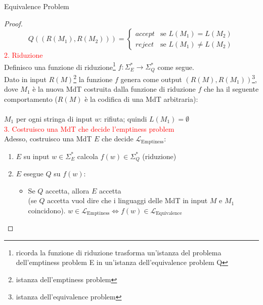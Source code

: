 \documentclass{article}  %
\theoremstyle{definition}
\begin{document}
\begin{theorem}{Equivalence Problem}
\begin{proof}
		\[
			Q((R(M_1),R(M_2))) =
			\begin{cases}
				accept & \text{se } L(M_1)=L(M_2)      \\
				reject & \text{se } L(M_1) \neq L(M_2)
			\end{cases}
		\]
		\textcolor{red}{2. Riduzione} \\
		Definisco una funzione di riduzione\footnote{ricorda la funzione di riduzione trasforma un'istanza del problema dell'emptiness problem
			E in un'istanza dell'equivalence problem Q}
		$f: \Sigma_E^* \rightarrow \Sigma_Q^*$ come segue. \\
		Dato in input $R(M)$\footnote{istanza dell'emptiness problem}  la funzione $f$ genera come output $(R(M),R(M_1))$\footnote
		{istanza dell'equivalence problem}, dove $M_1$ è la nuova MdT costruita dalla funzione di riduzione $f$ che ha il seguente
		comportamento ($R(M)$ è la codifica di una MdT arbitraria):\\ \\ $M_1$ per ogni stringa di input $w$: rifiuta; quindi $L(M_1)=\emptyset$ \\
		\textcolor{red}{3. Costruisco una MdT che decide l'emptiness problem} \\
		Adesso, costruisco una MdT $E$ che decide $\mathcal{L}_{\text{Emptiness}}$:
		\begin{enumerate}
			\item $E$ su input $w \in \Sigma_E^*$ calcola $f(w) \in \Sigma_Q^*$ (riduzione)
			\item $E$ esegue $Q$ su $f(w)$:
			      \begin{itemize}
				      \item Se $Q$ accetta, allora $E$ accetta \\
				            (se $Q$ accetta vuol dire che i linguaggi delle MdT in input $M$ e $M_1$ coincidono).
				            $w \in \mathcal{L}_{\text{Emptiness}} \iff f(w) \in \mathcal{L}_{\text{Equivalence}}$


\end{itemize}
\end{enumerate}
\end{proof}
\end{theorem}
\end{document}
